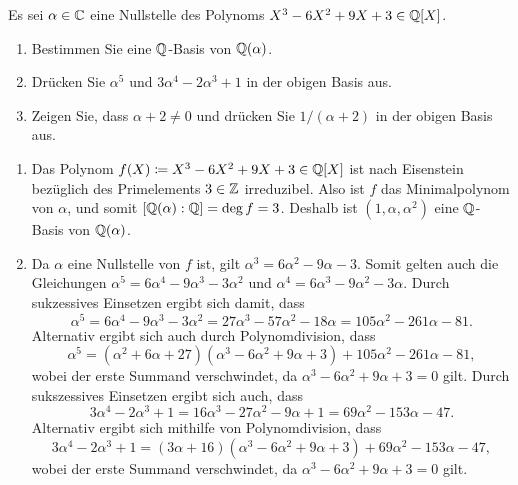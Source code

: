 \begin{question}[subtitle = Rechnen in zyklischen Erweiterungen]
  Es sei $\alpha \in \mathbb{C}$ eine Nullstelle des Polynoms $X^3 - 6 X^2 + 9 X + 3 \in \mathbb{Q}[X]$.
  \begin{enumerate}
    \item
      Bestimmen Sie eine $\mathbb{Q}$-Basis von $\mathbb{Q}(\alpha)$.
    \item
      Drücken Sie $\alpha^5$ und $3 \alpha^4 - 2 \alpha^3 + 1$ in der obigen Basis aus.
    \item
      Zeigen Sie, dass $\alpha + 2 \neq 0$ und drücken Sie $1/(\alpha + 2)$ in der obigen Basis aus.
  \end{enumerate}
\end{question}


\begin{solution}
  \begin{enumerate}
    \item
      Das Polynom $f(X) \coloneqq X^3 - 6 X^2 + 9 X + 3 \in \mathbb{Q}[X]$ ist nach Eisenstein bezüglich des Primelements $3 \in \mathbb{Z}$ irreduzibel.
      Also ist $f$ das Minimalpolynom von $\alpha$, und somit $[\mathbb{Q}(\alpha) : \mathbb{Q}] = \deg f = 3$.
      Deshalb ist $(1, \alpha, \alpha^2)$ eine $\mathbb{Q}$-Basis von $\mathbb{Q}(\alpha)$.
    
    \item
      Da $\alpha$ eine Nullstelle von $f$ ist, gilt $\alpha^3 = 6 \alpha^2 - 9 \alpha - 3$.
      Somit gelten auch die Gleichungen $\alpha^5 = 6 \alpha^4 - 9 \alpha^3 - 3 \alpha^2$ und $\alpha^4 = 6 \alpha^3 - 9 \alpha^2 - 3 \alpha$.
      Durch sukzessives Einsetzen ergibt sich damit, dass
      \[
          \alpha^5
        = 6 \alpha^4 - 9 \alpha^3 - 3 \alpha^2
        = 27 \alpha^3 - 57 \alpha^2 - 18 \alpha
        = 105 \alpha^2 - 261 \alpha - 81.
      \]
      Alternativ ergibt sich auch durch Polynomdivision, dass
      \[
          \alpha^5
        = (\alpha^2 + 6 \alpha + 27)(\alpha^3 - 6 \alpha^2 + 9 \alpha + 3) + 105 \alpha^2 - 261 \alpha - 81,
      \]
      wobei der erste Summand verschwindet, da $\alpha^3 - 6 \alpha^2 + 9 \alpha + 3 = 0$ gilt.
      Durch sukszessives Einsetzen ergibt sich auch, dass
      \[
          3 \alpha^4 - 2 \alpha^3 + 1
        = 16 \alpha^3 - 27 \alpha^2 - 9 \alpha + 1
        = 69 \alpha^2 - 153 \alpha - 47.
      \]
      Alternativ ergibt sich mithilfe von Polynomdivision, dass
      \[
          3 \alpha^4 - 2 \alpha^3 + 1
        = (3 \alpha + 16)(\alpha^3 - 6 \alpha^2 + 9 \alpha + 3) + 69 \alpha^2 - 153 \alpha - 47,
      \]
      wobei der erste Summand verschwindet, da $\alpha^3 - 6 \alpha^2 + 9 \alpha + 3 = 0$ gilt.
    

\end{enumerate}
\end{solution}
